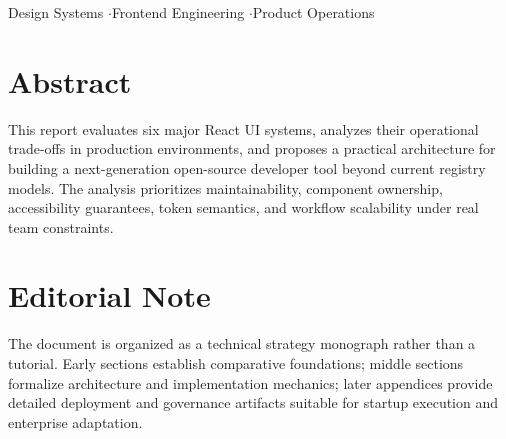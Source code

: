 \documentclass[11pt,twoside,a4paper]{article}
\begin{document}
\begin{center}
\vspace{0.2cm}
{\footnotesize\color{darkgray}
  Design Systems \enspace$\cdot$\enspace Frontend Engineering \enspace$\cdot$\enspace Product Operations
}

\vspace{0.3cm}

\end{center}

\setcounter{page}{1}

\clearpage
\thispagestyle{empty}
\section*{Abstract}
This report evaluates six major React UI systems, analyzes their operational trade-offs in production environments, and proposes a practical architecture for building a next-generation open-source developer tool beyond current registry models. The analysis prioritizes maintainability, component ownership, accessibility guarantees, token semantics, and workflow scalability under real team constraints.

\section*{Editorial Note}
The document is organized as a technical strategy monograph rather than a tutorial. Early sections establish comparative foundations; middle sections formalize architecture and implementation mechanics; later appendices provide detailed deployment and governance artifacts suitable for startup execution and enterprise adaptation.

\clearpage
\thispagestyle{empty}
\end{document}
